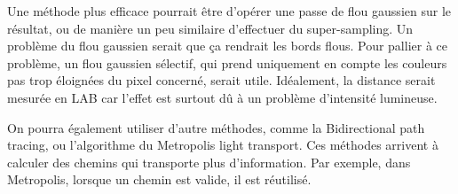 \documentclass{article}
\begin{document}
Une méthode plus efficace pourrait être d'opérer
une passe de flou gaussien sur le résultat, ou de manière un peu similaire
d'effectuer du super-sampling. Un problème du flou gaussien serait que ça
rendrait les bords flous. Pour pallier à ce problème, un flou gaussien
sélectif, qui prend uniquement en compte les couleurs pas trop éloignées du
pixel concerné, serait utile. Idéalement, la distance serait mesurée en LAB car
l'effet est surtout dû à un problème d'intensité lumineuse.


On pourra également utiliser d'autre méthodes, comme la Bidirectional path
tracing, ou l'algorithme du Metropolis light transport.
Ces méthodes arrivent à calculer des chemins qui transporte plus d'information.
Par exemple, dans Metropolis, lorsque un chemin est valide, il est réutilisé.
\end{document}
